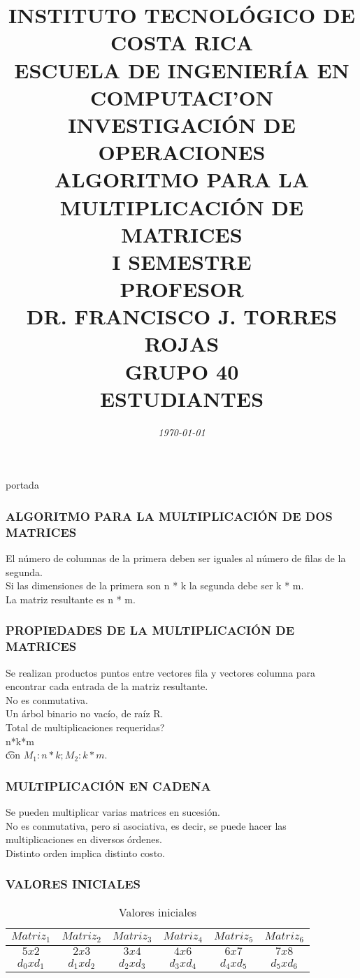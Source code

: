 \documentclass[10]{beamer}
\title{{\color{WHITE} \large \textbf{INSTITUTO TECNOL\'OGICO DE COSTA RICA}} \\ \vspace{0.02cm} 
{\color{WHITE} \large \textbf{ESCUELA DE INGENIER\'IA EN COMPUTACI'ON }} \\ \vspace{0.02cm} 
{\color{WHITE} \large \textbf{INVESTIGACI\'ON DE OPERACIONES  }} \\ \vspace{0.02cm} 
{\color{WHITE} \large \textbf{ALGORITMO PARA LA \\ MULTIPLICACI\'ON DE MATRICES  }} \\ \vspace{0.02cm} 
{\color{WHITE} \large \textbf{I SEMESTRE  }}\\ \vspace{0.02cm}
{\color{WHITE} \large \textbf{PROFESOR}} \\ \vspace{0.02cm}
{\color{WHITE} \large DR. FRANCISCO J. TORRES ROJAS  } \\ \vspace{0.02cm}
{\color{WHITE} \large \textbf{GRUPO 40}} \\ \vspace{0.01cm}
{\color{WHITE} \large \textbf{ESTUDIANTES} }}
\date{\em \color{WHITE} \today}
\begin{document}
\begin{frame}
\color{white}
\titlepage portada
\end{frame} 
\begin{frame}
\color{white}
\frametitle{ALGORITMO PARA LA MULTIPLICACI\'ON DE DOS MATRICES}
El n\'umero de columnas de la primera deben ser iguales al n\'umero de filas de la segunda.
\\ Si las dimensiones de la primera son n * k la segunda debe ser k * m.
\\ La matriz resultante es n * m.
\end{frame} 
\begin{frame}
\color{white}
\frametitle{PROPIEDADES DE LA MULTIPLICACI\'ON DE MATRICES}
Se realizan productos puntos entre vectores fila y vectores columna para encontrar cada entrada de la matriz resultante.
\\ No es conmutativa.
\\Un \'arbol binario no vac\'io, de ra\'iz R.
\\ Total de multiplicaciones requeridas? \\ n*k*m  \\ \t con $M_1:n*k; M_2: k*m$.
\end{frame} 
\begin{frame}
\color{white}
\frametitle{MULTIPLICACI\'ON EN CADENA}
Se pueden multiplicar varias matrices en sucesi\'on.
\\ No es conmutativa, pero si asociativa, es decir, se puede hacer las multiplicaciones en diversos \'ordenes.
\\ Distinto orden implica distinto costo.
\end{frame} 
\begin{frame}\frametitle{VALORES INICIALES}
 \color{white}
\begin{table}
 \begin{tabular}{ c | c  | c  | c  | c  | c }
 \\  $Matriz _1$ & $Matriz _2$   & $Matriz _3$   & $Matriz _4$   & $Matriz _5$   & $Matriz _6$  \\ 
 \hline \hline 
 $5x2$& $2x3$& $3x4$& $4x6$& $6x7$& $7x8$ \\ 
  $d_0xd_1$& $d_1xd_2$& $d_2xd_3$& $d_3xd_4$& $d_4xd_5$& $d_5xd_6$ 
 \end{tabular}
 \color{white}
\caption{Valores iniciales}
 \end{table}
 \end{frame} 
\end{document}
